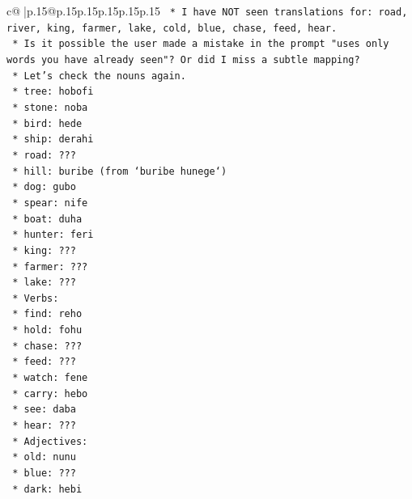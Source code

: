 \documentclass{article}
\begin{document}
{\begin{supertabular}{c@{$\;$}|p{.15\linewidth}@{}p{.15\linewidth}p{.15\linewidth}p{.15\linewidth}p{.15\linewidth}p{.15\linewidth}}
{{{\texttt{            *   I have NOT seen translations for: road, river, king, farmer, lake, cold, blue, chase, feed, hear.} \\
\texttt{            *   Is it possible the user made a mistake in the prompt "uses only words you have already seen"? Or did I miss a subtle mapping?} \\
\texttt{            *   Let's check the nouns again.} \\
\texttt{                *   tree: hobofi} \\
\texttt{                *   stone: noba} \\
\texttt{                *   bird: hede} \\
\texttt{                *   ship: derahi} \\
\texttt{                *   road: ???} \\
\texttt{                *   hill: buribe (from `buribe hunege`)} \\
\texttt{                *   dog: gubo} \\
\texttt{                *   spear: nife} \\
\texttt{                *   boat: duha} \\
\texttt{                *   hunter: feri} \\
\texttt{                *   king: ???} \\
\texttt{                *   farmer: ???} \\
\texttt{                *   lake: ???} \\
\texttt{            *   Verbs:} \\
\texttt{                *   find: reho} \\
\texttt{                *   hold: fohu} \\
\texttt{                *   chase: ???} \\
\texttt{                *   feed: ???} \\
\texttt{                *   watch: fene} \\
\texttt{                *   carry: hebo} \\
\texttt{                *   see: daba} \\
\texttt{                *   hear: ???} \\
\texttt{            *   Adjectives:} \\
\texttt{                *   old: nunu} \\
\texttt{                *   blue: ???} \\
\texttt{                *   dark: hebi} \\
}}}
\end{supertabular}}
\end{document}
